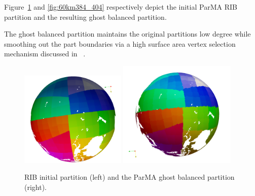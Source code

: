 \documentclass[a4paper]{article}
\begin{document}
Figure~\ref{fig:60km0_255} and \ref{fig:60km384_404} respectively depict the
initial ParMA RIB partition and the resulting ghost balanced partition.

The ghost balanced partition maintains the original partitions low degree while
smoothing out the part boundaries via a high surface area vertex selection
mechanism discussed in ~\cite{ParMA-2014}.

\begin{figure}
\centering
\includegraphics[width=0.45\textwidth]{60km/init/0_255.png}
\includegraphics[width=0.5\textwidth]{60km/final/0_255.png}
\caption{\label{fig:60km0_255} RIB initial partition (left) and the ParMA ghost balanced partition (right).}


\end{figure}
\end{document}
